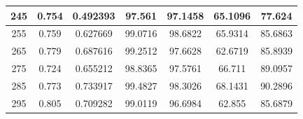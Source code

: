 \begin{appendices}
\begin{table}
\begin{tabular}{ |c|c|c|c|c|c|c| }
\hline
245 &  0.754 &  0.492393 &  97.561 &  97.1458 &  65.1096 &  77.624 \\
\hline
255 &  0.759 &  0.627669 &  99.0716 &  98.6822 &  65.9314 &  85.6863 \\
\hline
265 &  0.779 &  0.687616 &  99.2512 &  97.6628 &  62.6719 &  85.8939 \\
\hline
275 &  0.724 &  0.655212 &  98.8365 &  97.5761 &  66.711 &  89.0957 \\
\hline
285 &  0.773 &  0.733917 &  99.4827 &  98.3026 &  68.1431 &  90.2896 \\
\hline
295 &  0.805 &  0.709282 &  99.0119 &  96.6984 &  62.855 &  85.6879 \\
\hline
\end{tabular}

\end{table}


\end{appendices}
